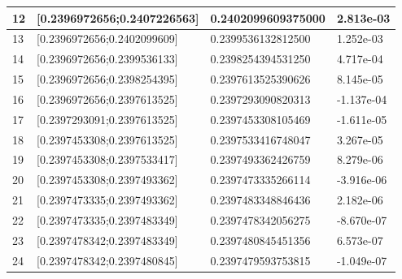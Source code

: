 \documentclass[a4paper, 11pt]{article}
\begin{document}
\begin{table}[H]
\begin{tabular}{llll}
\multicolumn{1}{|l|}{12} & \multicolumn{1}{l|}{{[}0.2396972656;0.2407226563{]}} & \multicolumn{1}{l|}{0.2402099609375000} & \multicolumn{1}{l|}{2.813e-03} \\ \hline
\multicolumn{1}{|l|}{13} & \multicolumn{1}{l|}{{[}0.2396972656;0.2402099609{]}} & \multicolumn{1}{l|}{0.2399536132812500} & \multicolumn{1}{l|}{1.252e-03} \\ \hline
\multicolumn{1}{|l|}{14} & \multicolumn{1}{l|}{{[}0.2396972656;0.2399536133{]}} & \multicolumn{1}{l|}{0.2398254394531250} & \multicolumn{1}{l|}{4.717e-04} \\ \hline
\multicolumn{1}{|l|}{15} & \multicolumn{1}{l|}{{[}0.2396972656;0.2398254395{]}} & \multicolumn{1}{l|}{0.2397613525390626} & \multicolumn{1}{l|}{8.145e-05} \\ \hline
\multicolumn{1}{|l|}{16} & \multicolumn{1}{l|}{{[}0.2396972656;0.2397613525{]}} & \multicolumn{1}{l|}{0.2397293090820313} & \multicolumn{1}{l|}{-1.137e-04} \\ \hline
\multicolumn{1}{|l|}{17} & \multicolumn{1}{l|}{{[}0.2397293091;0.2397613525{]}} & \multicolumn{1}{l|}{0.2397453308105469} & \multicolumn{1}{l|}{-1.611e-05} \\ \hline
\multicolumn{1}{|l|}{18} & \multicolumn{1}{l|}{{[}0.2397453308;0.2397613525{]}} & \multicolumn{1}{l|}{0.2397533416748047} & \multicolumn{1}{l|}{3.267e-05} \\ \hline
\multicolumn{1}{|l|}{19} & \multicolumn{1}{l|}{{[}0.2397453308;0.2397533417{]}} & \multicolumn{1}{l|}{0.2397493362426759} & \multicolumn{1}{l|}{8.279e-06} \\ \hline
\multicolumn{1}{|l|}{20} & \multicolumn{1}{l|}{{[}0.2397453308;0.2397493362{]}} & \multicolumn{1}{l|}{0.2397473335266114} & \multicolumn{1}{l|}{-3.916e-06} \\ \hline
\multicolumn{1}{|l|}{21} & \multicolumn{1}{l|}{{[}0.2397473335;0.2397493362{]}} & \multicolumn{1}{l|}{0.2397483348846436} & \multicolumn{1}{l|}{2.182e-06} \\ \hline
\multicolumn{1}{|l|}{22} & \multicolumn{1}{l|}{{[}0.2397473335;0.2397483349{]}} & \multicolumn{1}{l|}{0.2397478342056275} & \multicolumn{1}{l|}{-8.670e-07} \\ \hline
\multicolumn{1}{|l|}{23} & \multicolumn{1}{l|}{{[}0.2397478342;0.2397483349{]}} & \multicolumn{1}{l|}{0.2397480845451356} & \multicolumn{1}{l|}{6.573e-07} \\ \hline
\multicolumn{1}{|l|}{24} & \multicolumn{1}{l|}{{[}0.2397478342;0.2397480845{]}} & \multicolumn{1}{l|}{0.2397479593753815} & \multicolumn{1}{l|}{-1.049e-07} \\ \hline

\end{tabular}
\end{table}
\end{document}
